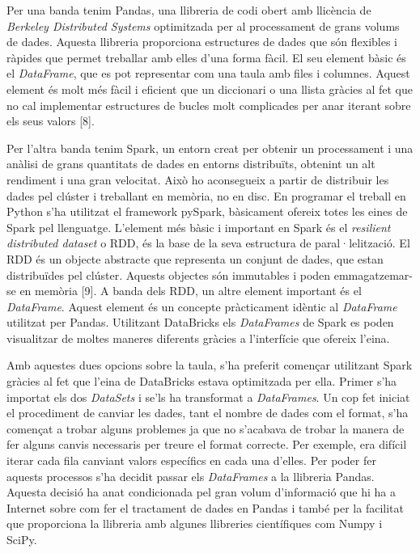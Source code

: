 \documentclass[10pt,a4paper,twocolumn,twoside]{article}
\begin{document}
Per una banda tenim Pandas, una llibreria de codi obert amb llicència de \textit{Berkeley Distributed Systems} optimitzada per al processament de grans volums de dades. Aquesta llibreria proporciona estructures de dades que són flexibles i ràpides que permet treballar amb elles d'una forma fàcil. El seu element bàsic és el \textit{DataFrame}, que es pot representar com una taula amb files i columnes. Aquest element és molt més fàcil i eficient que un diccionari o una llista gràcies al fet que no cal implementar estructures de bucles molt complicades per anar iterant sobre els seus valors [8].

Per l'altra banda tenim Spark, un entorn creat per obtenir un processament i una anàlisi de grans quantitats de dades en entorns distribuïts, obtenint un alt rendiment i una gran velocitat. Això ho aconsegueix a partir de distribuir les dades pel clúster i treballant en memòria, no en disc. En programar el treball en Python s'ha utilitzat el framework pySpark, bàsicament ofereix totes les eines de Spark pel llenguatge. L'element més bàsic i important en Spark és el \textit{resilient distributed dataset} o RDD, és la base de la seva estructura de paral·lelització. El RDD és un objecte abstracte que representa un conjunt de dades, que estan distribuïdes pel clúster. Aquests objectes són immutables i poden emmagatzemar-se en memòria [9]. A banda dels RDD, un altre element important és el \textit{DataFrame}. Aquest element és un concepte pràcticament idèntic al \textit{DataFrame} utilitzat per Pandas. Utilitzant DataBricks els \textit{DataFrames} de Spark es poden visualitzar de moltes maneres diferents gràcies a l'interfície que ofereix l'eina.

Amb aquestes dues opcions sobre la taula, s'ha preferit començar utilitzant Spark gràcies al fet que l'eina de DataBricks estava optimitzada per ella. Primer s'ha importat els dos \textit{DataSets} i se'ls ha transformat a \textit{DataFrames}. Un cop fet iniciat el procediment de canviar les dades, tant el nombre de dades com el format, s'ha començat a trobar alguns problemes ja que no s'acabava de trobar la manera de fer alguns canvis necessaris per treure el format correcte. Per exemple, era difícil iterar cada fila canviant valors específics en cada una d'elles. Per poder fer aquests processos s'ha decidit passar els \textit{DataFrames} a la llibreria Pandas. Aquesta decisió ha anat condicionada pel gran volum d'informació que hi ha a Internet sobre com fer el tractament de dades en Pandas i també per la facilitat que proporciona la llibreria amb algunes llibreries científiques com Numpy i SciPy.
\end{document}
